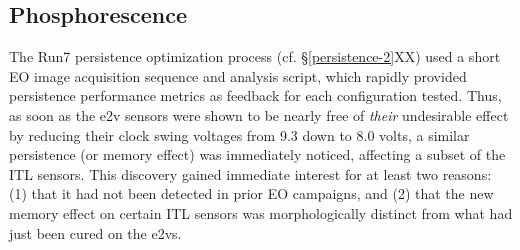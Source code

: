 \subsection{Phosphorescence}\label{phosphorescence}

The Run7 persistence optimization process (cf. \S\ref{persistence-2}XX) used a short EO image acquisition sequence and analysis script, which rapidly provided persistence performance metrics as feedback for each configuration tested. Thus, as soon as the e2v sensors were shown to be nearly free of {\it their} undesirable effect by reducing their clock swing voltages from 9.3 down to 8.0 volts, a similar persistence (or memory effect) was immediately noticed, affecting a subset of the ITL sensors. This discovery gained immediate interest for at least two reasons: (1) that it had not been detected in prior EO campaigns, and (2) that the new memory effect on certain ITL sensors was morphologically distinct from what had just been cured on the e2vs. 

